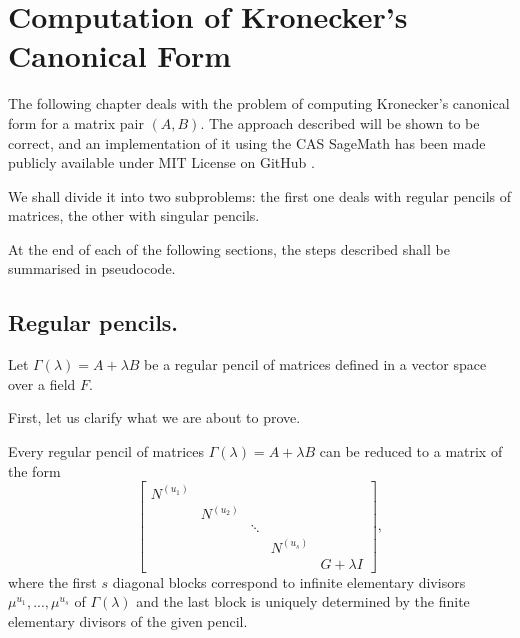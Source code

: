 \section{Computation of Kronecker's Canonical Form}
The following chapter deals with the problem of computing Kronecker's canonical form for a matrix pair \((A, B)\).
The approach described will be shown to be correct, and an implementation
of it using the CAS SageMath has been made publicly available under MIT License on GitHub
\cite{Trapani_Computation_of_Kronecker_s}.


We shall divide it into two subproblems: the first one deals with regular pencils of matrices, the other with
singular pencils.

At the end of each of the following sections, the steps described shall be summarised in pseudocode.

\subsection*{Regular pencils.}
Let \(\Gamma(\lambda) = A + \lambda B\) be a regular pencil of matrices defined in a vector space over a
field \(F\).

First, let us clarify what we are about to prove.
\begin{theorem}
    Every regular pencil of matrices \(\Gamma(\lambda) = A + \lambda B\) can be reduced to a matrix of the form
    \[
        \begin{bmatrix}
            N^{(u_{1})} \\
            & N^{(u_{2})} \\
            & & \ddots \\
            & & & N^{(u_{s})} \\
            & & & & G + \lambda I
        \end{bmatrix},
    \]
    where the first \(s\) diagonal blocks correspond to infinite elementary divisors
    \(\mu^{u_{1}}, ..., \mu^{u_{s}}\) of \(\Gamma(\lambda)\) and the last block is uniquely determined by the
    finite elementary divisors of the given pencil.
\end{theorem}

